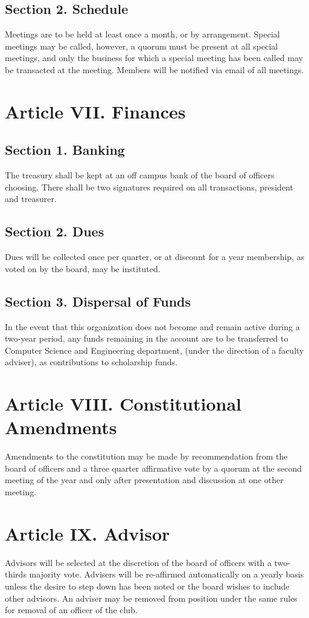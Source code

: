 \documentclass{article}
\begin{document}
  \subsection{Section 2. Schedule}
  Meetings are to be held at least once a month, or by arrangement. Special meetings may be called, however, a quorum must be present at all special meetings, and only the business for which a special meeting has been called may be transacted at the meeting. Members will be notified via email of all meetings.

\section{Article VII. Finances}
  \subsection{Section 1. Banking}
  The treasury shall be kept at an off campus bank of the board of officers choosing. There shall be two signatures required on all transactions, president and treasurer.

  \subsection{Section 2. Dues}
  Dues will be collected once per quarter, or at discount for a year membership, as voted on by the board, may be instituted.

  \subsection{Section 3. Dispersal of Funds}
  In the event that this organization does not become and remain active during a two-year period, any funds remaining in the account are to be transferred to Computer Science and Engineering department, (under the direction of a faculty adviser), as contributions to scholarship funds.

\section{Article VIII. Constitutional Amendments}
Amendments to the constitution may be made by recommendation from the board of officers and a three quarter affirmative vote by a quorum at the second meeting of the year and only after presentation and discussion at one other meeting.

\section{Article IX. Advisor}
Advisors will be selected at the discretion of the board of officers with a two-thirds majority vote. Advisers will be re-affirmed automatically on a yearly basis unless the desire to step down has been noted or the board wishes to include other advisors. An adviser may be removed from position under the same rules for removal of an officer of the club.
\end{document}
